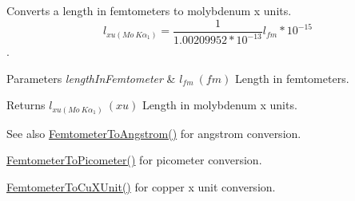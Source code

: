 Converts a length in femtometers to molybdenum x units. \[ l_{xu(Mo\ K\alpha_1)}=\frac{1}{1.00209952*10^{-13}} l_{fm} * 10^{-15}\]. 


\begin{DoxyParams}{Parameters}
{\em length\+In\+Femtometer} & $ l_{fm}\ (fm)$ Length in femtometers. \\
\hline
\end{DoxyParams}
\begin{DoxyReturn}{Returns}
$ l_{xu(Mo\ K\alpha_1)}\ (xu)$ Length in molybdenum x units. 
\end{DoxyReturn}
\begin{DoxySeeAlso}{See also}
\mbox{\hyperlink{group___e_g_x_math-_conversions-_length_conversions-_femtometer-_non-_s_i_ga72862654ebe3812db0fbf8d11d7059ff}{Femtometer\+To\+Angstrom()}} for angstrom conversion. 

\mbox{\hyperlink{group___e_g_x_math-_conversions-_length_conversions-_femtometer-_s_i_gadfcd6b374d4134cad0ac1ce7a8e50509}{Femtometer\+To\+Picometer()}} for picometer conversion. 

\mbox{\hyperlink{group___e_g_x_math-_conversions-_length_conversions-_femtometer-_non-_s_i_ga59bde341fe80506851e39cd2ceb3747b}{Femtometer\+To\+Cu\+X\+Unit()}} for copper x unit conversion. 
\end{DoxySeeAlso}
